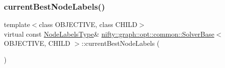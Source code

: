 \subsubsection{\texorpdfstring{current\+Best\+Node\+Labels()}{currentBestNodeLabels()}}
{\footnotesize\ttfamily template$<$class O\+B\+J\+E\+C\+T\+I\+VE, class C\+H\+I\+LD$>$ \\
virtual const \hyperlink{classnifty_1_1graph_1_1opt_1_1common_1_1SolverBase_abefd51561de2fd009f6bed6bef6009ea}{Node\+Labels\+Type}\& \hyperlink{classnifty_1_1graph_1_1opt_1_1common_1_1SolverBase}{nifty\+::graph\+::opt\+::common\+::\+Solver\+Base}$<$ O\+B\+J\+E\+C\+T\+I\+VE, C\+H\+I\+LD $>$\+::current\+Best\+Node\+Labels (\begin{DoxyParamCaption}{ }\end{DoxyParamCaption})\hspace{0.3cm}{\ttfamily [pure virtual]}}



